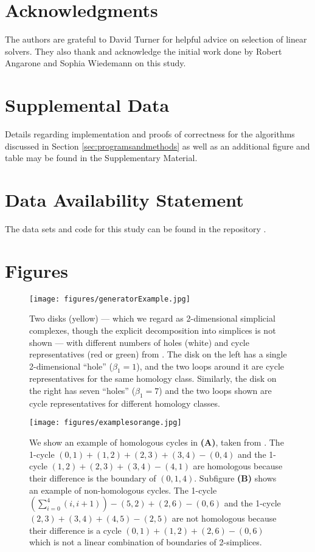 \documentclass[utf8]{formatting_stuff/frontiersFPHY}
\newcommand{\se}{Section }
\theoremstyle{plain}
\theoremstyle{definition}
\begin{document}
\section{Acknowledgments} 
The authors are grateful to David Turner for helpful advice on selection of linear solvers. They also thank and acknowledge the initial work done by Robert Angarone and Sophia Wiedemann on this study.


\section{Supplemental Data}

Details regarding implementation and proofs of correctness for the algorithms discussed in \se \ref{sec:programsandmethods} as well as an additional figure and table may be found in the Supplementary Material.


\section{Data Availability Statement}
The data sets and code for this study can be found in the repository \cite{li_thompson}.

  


 
\section{Figures}
\label{figures} 

\begin{figure}[!h]
    \centering
    \texttt{[image: figures/generatorExample.jpg]}
    \caption{Two disks (yellow) --- which we regard as 2-dimensional simplicial complexes, though the explicit decomposition into simplices is not shown --- with different numbers of holes (white) and cycle representatives (red or green) from \cite{Carlsson2009TopologyAD}. The disk on the left has a single 2-dimensional  ``hole'' ($\beta_1 = 1$), and the two loops around it are cycle representatives for the same homology class. Similarly, the disk on the right has seven ``holes'' ($\beta_1 = 7$) and the two loops shown are cycle representatives for different homology classes.
    }
    \label{fig:generatorExamples}
\end{figure}

 \begin{figure}[h!]
\begin{center}
\texttt{[image: figures/examplesorange.jpg]} 
\end{center}
\caption{We show an example of homologous cycles in \textbf{(A)}, taken from \cite{TZH15}. The 1-cycle $(0,1) + (1,2) + (2,3) + (3,4) - (0,4)$ and the 1-cycle $(1,2) + (2,3) + (3,4) - (4,1)$ are homologous because their difference is the boundary of $(0,1,4)$. Subfigure \textbf{(B)} shows an example of non-homologous cycles. The 1-cycle $(\sum_{i=0}^4 (i, i+1))-(5,2)+(2,6)-(0,6)$ and the 1-cycle $(2,3) + (3,4)+(4,5)-(2,5)$ are not homologous because their difference is a cycle $(0,1)+(1,2)+(2,6)-(0,6)$ which is not a linear combination of boundaries of 2-simplices. } \label{fig:boundaryexample}
\end{figure}
\end{document}
